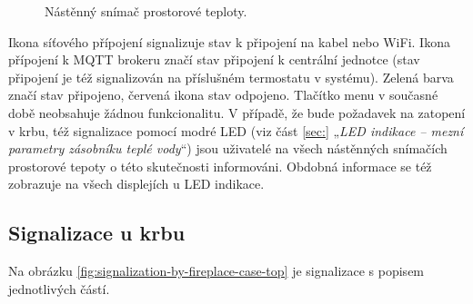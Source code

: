 \begin{Czech}
\begin{figure}[H]
\caption{Nástěnný snímač prostorové teploty.}
\label{fig:wall-mounted-room-temperature-sensor-with-case}
\end{figure}
\end{Czech}

\begin{Czech}
Ikona síťového přípojení signalizuje stav k připojení na kabel nebo WiFi. Ikona přípojení k MQTT brokeru značí stav připojení k centrální jednotce (stav připojení je též signalizován na příslušném termostatu v systému). Zelená barva značí stav připojeno, červená ikona stav odpojeno. Tlačítko menu v současné době neobsahuje žádnou funkcionalitu. V  případě, že bude požadavek na zatopení v krbu, též signalizace pomocí modré LED (viz část \ref{sec:} „\textit{LED indikace – mezní parametry zásobníku teplé vody}“) jsou uživatelé na všech nástěnných snímačích prostorové tepoty o této skutečnosti informováni. Obdobná informace se též zobrazuje na všech displejích u LED indikace.
\end{Czech}


\begin{Czech}
\subsection{Signalizace u krbu}
\end{Czech}

\begin{Czech}
Na obrázku \ref{fig:signalization-by-fireplace-case-top} je signalizace s popisem jednotlivých částí.
\end{Czech}

